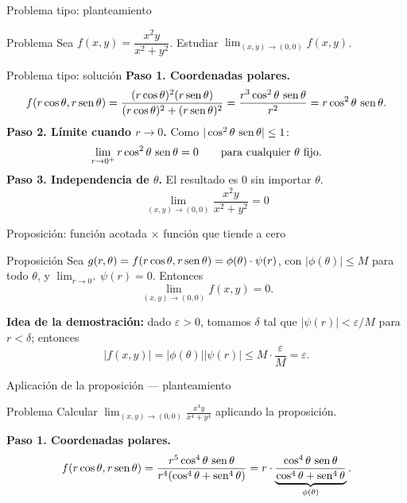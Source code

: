 \documentclass[11pt,aspectratio=169]{beamer}
\begin{document}
\begin{frame}{Problema tipo: planteamiento}
  \begin{block}{Problema}
    Sea $f(x,y)=\dfrac{x^2y}{x^2+y^2}$. Estudiar $\displaystyle\lim_{(x,y)\to(0,0)} f(x,y)$.
  \end{block}
\end{frame}

\begin{frame}{Problema tipo: solución}
  \textbf{Paso 1. Coordenadas polares.}
  \[
    f(r\cos\theta,r\operatorname{sen}\theta)
    =\frac{(r\cos\theta)^2(r\operatorname{sen}\theta)}{(r\cos\theta)^2+(r\operatorname{sen}\theta)^2}
    =\frac{r^3\cos^2\theta\,\operatorname{sen}\theta}{r^2}
    =r\cos^2\theta\,\operatorname{sen}\theta.
  \]
  \pause
  \textbf{Paso 2. Límite cuando $r\to 0$.} Como $|\cos^2\theta\,\operatorname{sen}\theta|\le 1$:
  \[
    \lim_{r\to 0^+} r\cos^2\theta\,\operatorname{sen}\theta=0
    \qquad\text{para cualquier }\theta\text{ fijo.}
  \]
  \pause
  \textbf{Paso 3. Independencia de $\theta$.} El resultado es $0$ sin importar $\theta$.
  \pause
  \[
    \boxed{\lim_{(x,y)\to(0,0)}\frac{x^2y}{x^2+y^2}=0}
  \]
\end{frame}

\begin{frame}{Proposición: función acotada $\times$ función que tiende a cero}
  \begin{block}{Proposición}
    Sea $g(r,\theta)=f(r\cos\theta,r\operatorname{sen}\theta)=\phi(\theta)\cdot\psi(r)$, con $|\phi(\theta)|\le M$ para todo $\theta$, y $\lim_{r\to 0^+}\psi(r)=0$. Entonces
    \[
      \lim_{(x,y)\to(0,0)} f(x,y)=0.
    \]
  \end{block}
  \pause
  \vspace{2pt}
  {\small\textbf{Idea de la demostración:} dado $\varepsilon>0$, tomamos $\delta$ tal que $|\psi(r)|<\varepsilon/M$ para $r<\delta$; entonces
  \[
    |f(x,y)|=|\phi(\theta)||\psi(r)|\le M\cdot\frac{\varepsilon}{M}=\varepsilon.
  \]}
  \pause
\end{frame}

\begin{frame}{Aplicación de la proposición --- planteamiento}
  \begin{block}{Problema}
    Calcular $\displaystyle\lim_{(x,y)\to(0,0)}\frac{x^4y}{x^4+y^4}$ aplicando la proposición.
  \end{block}
  \pause
  \textbf{Paso 1. Coordenadas polares.}
  \[
    f(r\cos\theta,r\operatorname{sen}\theta)
    =\frac{r^5\cos^4\theta\,\operatorname{sen}\theta}{r^4(\cos^4\theta+\operatorname{sen}^4\theta)}
    =r\cdot\underbrace{\frac{\cos^4\theta\,\operatorname{sen}\theta}{\cos^4\theta+\operatorname{sen}^4\theta}}_{\phi(\theta)}.
  \]
\end{frame}
\end{document}
